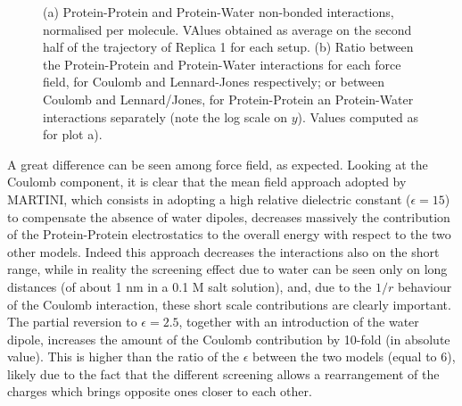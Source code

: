 \begin{figure}[p!]
\centering
{} 
\caption[Non-bonded protein energy contribution to capsule structures]{(a) Protein-Protein and Protein-Water non-bonded interactions, normalised per molecule. VAlues obtained as average on the second half of the trajectory of Replica 1 for each setup. (b) Ratio between the Protein-Protein and Protein-Water interactions for each force field, for Coulomb and Lennard-Jones respectively; or between Coulomb and Lennard/Jones, for Protein-Protein an Protein-Water interactions separately (note the log scale on $y$). Values computed as for plot a).}
\label{fig:eng_cg}
\end{figure}

A great difference can be seen among force field, as expected. Looking at the Coulomb component, it is clear that the mean field approach adopted by MARTINI, which consists in adopting a high relative dielectric constant ($\epsilon = 15$) to compensate the absence of water dipoles, decreases massively the contribution of the Protein-Protein electrostatics to the overall energy with respect to the two other models. Indeed this approach decreases the interactions also on the short range, while in reality the screening effect due to water can be seen only on long distances (of about 1 nm in a 0.1 M salt solution), and, due to the $1/r$ behaviour of the Coulomb interaction, these short scale contributions are clearly important.
%
The partial reversion to $\epsilon = 2.5$, together with an introduction of the water dipole, increases the amount of the Coulomb contribution by 10-fold (in absolute value).
%
This is higher than the ratio of the $\epsilon$ between the two models (equal to $6$), likely due to the fact that the different screening allows a rearrangement of the charges which brings opposite ones closer to each other.

